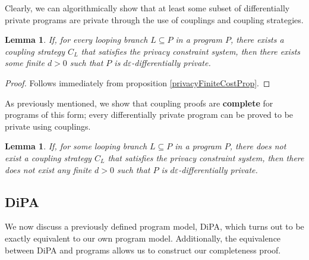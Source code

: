 \documentclass[12pt]{article}
\newtheorem{lemma}[thm]{Lemma}
\theoremstyle{definition}
\begin{document}
Clearly, we can algorithmically show that at least some subset of differentially private programs are private through the use of couplings and coupling strategies. 

\begin{lemma}
    If, for every looping branch $L\subseteq P$ in a program $P$, there exists a coupling strategy $C_L$ that satisfies the privacy constraint system, then there exists some finite $d>0$ such that $P$ is $d\varepsilon$-differentially private.    
\end{lemma}
\begin{proof}
    Follows immediately from proposition \ref{privacyFiniteCostProp}.
\end{proof}

As previously mentioned, we show that coupling proofs are \textbf{complete} for programs of this form; every differentially private program can be proved to be private using couplings. 

\begin{lemma}\label{ProgramCounterexampleLemma}
    If, for some looping branch $L\subseteq P$ in a program $P$, there does not exist a coupling strategy $C_L$ that satisfies the privacy constraint system, then there does not exist any finite $d>0$ such that $P$ is $d\varepsilon$-differentially private.
\end{lemma}

\subsection{DiPA}

We now discuss a previously defined program model, DiPA, which turns out to be exactly equivalent to our own program model. Additionally, the equivalence between DiPA and programs allows us to construct our completeness proof. 
\end{document}
